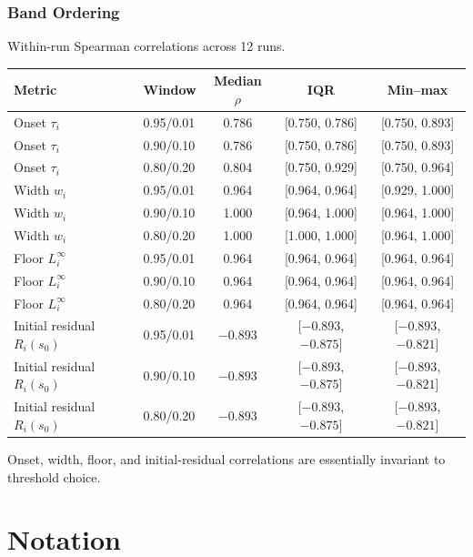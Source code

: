 \documentclass{article}
\begin{document}
\subsubsection{Band Ordering}\label{app:robustness-band-ordering}

Within-run Spearman correlations across 12 runs.
\begin{center}
\small
\begin{tabular}{@{}llccc@{}}
\toprule
Metric & Window & Median $\rho$ & IQR & Min--max \\
\midrule
Onset $\tau_i$ & 0.95/0.01 & 0.786 & [0.750, 0.786] & [0.750, 0.893] \\
Onset $\tau_i$ & 0.90/0.10 & 0.786 & [0.750, 0.786] & [0.750, 0.893] \\
Onset $\tau_i$ & 0.80/0.20 & 0.804 & [0.750, 0.929] & [0.750, 0.964] \\
Width $w_i$ & 0.95/0.01 & 0.964 & [0.964, 0.964] & [0.929, 1.000] \\
Width $w_i$ & 0.90/0.10 & 1.000 & [0.964, 1.000] & [0.964, 1.000] \\
Width $w_i$ & 0.80/0.20 & 1.000 & [1.000, 1.000] & [0.964, 1.000] \\
Floor $L_i^\infty$ & 0.95/0.01 & 0.964 & [0.964, 0.964] & [0.964, 0.964] \\
Floor $L_i^\infty$ & 0.90/0.10 & 0.964 & [0.964, 0.964] & [0.964, 0.964] \\
Floor $L_i^\infty$ & 0.80/0.20 & 0.964 & [0.964, 0.964] & [0.964, 0.964] \\
Initial residual $R_i(s_0)$ & 0.95/0.01 & $-0.893$ & [$-0.893$, $-0.875$] & [$-0.893$, $-0.821$] \\
Initial residual $R_i(s_0)$ & 0.90/0.10 & $-0.893$ & [$-0.893$, $-0.875$] & [$-0.893$, $-0.821$] \\
Initial residual $R_i(s_0)$ & 0.80/0.20 & $-0.893$ & [$-0.893$, $-0.875$] & [$-0.893$, $-0.821$] \\
\bottomrule
\end{tabular}
\end{center}

Onset, width, floor, and initial-residual correlations are essentially
invariant to threshold choice.

\section{Notation}\label{appendix:notation}
\end{document}
